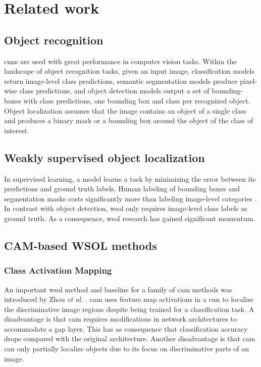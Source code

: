 \chapter{Related work} \label{ch:related_work}
\section{Object recognition}
\acrfull{cnn}s are used with great performance in computer vision tasks. Within the landscape of object recognition tasks, given an input image, classification models \cite{lecun1998gradient} return image-level class predictions, semantic segmentation models \cite{shelhamer2017fully} produce pixel-wise class predictions, and object detection models \cite{girshick2014rich, girshick2015fast, ren2015faster} output a set of bounding-boxes with class predictions, one bounding box and class per recognized object. Object localization \cite{russakovsky2015imagenet} assumes that the image contains an object of a single class and produces a binary mask or a bounding box around the object of the class of interest.

\section{Weakly supervised object localization}
In supervised learning, a model learns a task by minimizing the error between its predictions and ground truth labels. Human labeling of bounding boxes and segmentation masks costs significantly more than labeling image-level categories \cite{papandreou2015weakly}. In contrast with object detection, \acrshort{wsol} only requires image-level class labels as ground truth. As a consequence,  \acrshort{wsol} research \cite{zhou2016cvpr, zhang2018adversarial, zhang2018self, choe2019attention, singh2017hide} has gained significant momentum.

\section{CAM-based WSOL methods}
\subsection{Class Activation Mapping}
An important \acrshort{wsol} method and baseline for a family of \acrshort{cam} methods was introduced by Zhou \textit{et al.} \cite{zhou2016cvpr}. \acrfull{cam} uses feature map activations in a \acrlong{cnn} to localize the discriminative image regions despite being trained for a classification task. A disadvantage is that \acrshort{cam} requires modifications in network architectures to accommodate a \acrlong{gap} layer. This has as consequence that classification accuracy drops compared with the original architecture. Another disadvantage is that \acrshort{cam} can only partially localize objects due to its focus on discriminative parts of an image. 

